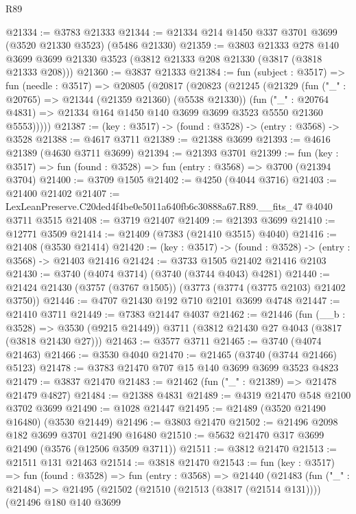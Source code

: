 \begin{lexlean}{R89}
\begin{coremodule}
@21334 := @3783 @21333
@21344 := @21334 @214 @1450 @337 @3701 @3699 (@3520 @21330 @3523) (@5486 @21330)
@21359 := @3803
    @21333
    @278
    @140
    @3699
    @3699
    @21330
    @3523
    (@3812 @21333 @208 @21330 (@3817 (@3818 @21333 @208)))
@21360 := @3837 @21333
@21384 := fun (subject : @3517) =>
  fun (needle : @3517) =>
  @20805
    (@20817
      (@20823
        (@21245
          (@21329
            (fun ("_" : @20765) => @21344 (@21359 @21360) (@5538 @21330))
            (fun ("_" : @20764 @4831) =>
            @21334 @164 @1450 @140 @3699 @3699 @3523 @5550 @21360 @5553)))))
@21387 := (key : @3517) -> (found : @3528) -> (entry : @3568) -> @3528
@21388 := @4617 @3711
@21389 := @21388 @3699
@21393 := @4616 @21389 (@4630 @3711 @3699)
@21394 := @21393 @3701
@21399 := fun (key : @3517) => fun (found : @3528) => fun (entry : @3568) => @3700 (@21394 @3704)
@21400 := @3709 @1505
@21402 := @4250 (@4044 @3716)
@21403 := @21400 @21402
@21407 := LexLeanPreserve.C20ded4f4be0e5011a640fb6c30888a67.R89.__fits_47 @4040 @3711 @3515
@21408 := @3719 @21407
@21409 := @21393 @3699
@21410 := @12771 @3509
@21414 := @21409 (@7383 (@21410 @3515) @4040)
@21416 := @21408 (@3530 @21414)
@21420 := (key : @3517) -> (found : @3528) -> (entry : @3568) -> @21403 @21416
@21424 := @3733 @1505 @21402 @21416 @2103
@21430 := @3740 (@4074 @3714) (@3740 (@3744 @4043) @4281)
@21440 := @21424 @21430 (@3757 (@3767 @1505)) (@3773 (@3774 (@3775 @2103) @21402 @3750))
@21446 := @4707 @21430 @192 @710 @2101 @3699 @4748
@21447 := @21410 @3711
@21449 := @7383 @21447 @4037
@21462 := @21446
    (fun (__b : @3528) => @3530 (@9215 @21449))
    @3711
    (@3812 @21430 @27 @4043 (@3817 (@3818 @21430 @27)))
@21463 := @3577 @3711
@21465 := @3740 (@4074 @21463)
@21466 := @3530 @4040
@21470 := @21465 (@3740 (@3744 @21466) @5123)
@21478 := @3783 @21470 @707 @15 @140 @3699 @3699 @3523 @4823
@21479 := @3837 @21470
@21483 := @21462 (fun ("_" : @21389) => @21478 @21479 @4827)
@21484 := @21388 @4831
@21489 := @4319 @21470 @548 @2100 @3702 @3699
@21490 := @1028 @21447
@21495 := @21489 (@3520 @21490 @16480) (@3530 @21449)
@21496 := @3803 @21470
@21502 := @21496 @2098 @182 @3699 @3701 @21490 @16480
@21510 := @5632 @21470 @317 @3699 @21490 (@3576 (@12506 @3509 @3711))
@21511 := @3812 @21470
@21513 := @21511 @131 @21463
@21514 := @3818 @21470
@21543 := fun (key : @3517) =>
  fun (found : @3528) =>
  fun (entry : @3568) =>
  @21440
    (@21483
      (fun ("_" : @21484) =>
      @21495
        (@21502
          (@21510 (@21513 (@3817 (@21514 @131))))
          (@21496
            @180
            @140
            @3699

\end{coremodule}
\end{lexlean}
